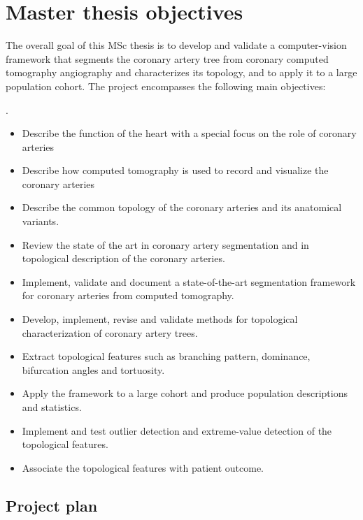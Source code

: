 
\section*{Master thesis objectives}

The overall goal of this MSc thesis is to develop and validate a computer-vision framework that
segments the coronary artery tree from coronary computed tomography angiography and
characterizes its topology, and to apply it to a large population cohort. The project
encompasses the following main objectives:

.

\begin{itemize}
  \item Describe the function of the heart with a special focus on the role of coronary arteries
  \item Describe how computed tomography is used to record and visualize the coronary arteries
  \item Describe the common topology of the coronary arteries and its anatomical variants.
  \item Review the state of the art in coronary artery segmentation and in topological
    description of the coronary arteries.
  \item Implement, validate and document a state-of-the-art segmentation framework for
    coronary arteries from computed tomography.
  \item Develop, implement, revise and validate methods for topological characterization of
    coronary artery trees.
  \item Extract topological features such as branching pattern, dominance, bifurcation
    angles and tortuosity.
  \item Apply the framework to a large cohort and produce population descriptions and
    statistics.
  \item Implement and test outlier detection and extreme-value detection of the topological
    features.
  \item Associate the topological features with patient outcome.
\end{itemize}






\subsection*{Project plan}


